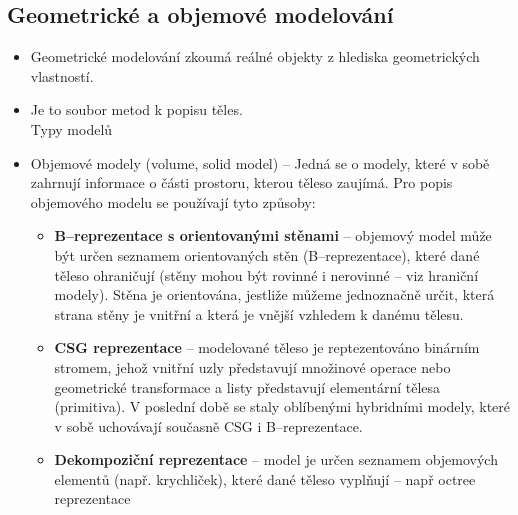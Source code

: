 
\subsection{Geometrické a objemové modelování}
\begin{itemize}
	\item Geometrické modelování zkoumá reálné objekty z hlediska geometrických vlastností.
	\item Je to soubor metod k popisu těles. \\ Typy modelů
	\item Objemové modely (volume, solid model) -- Jedná se o modely, které v sobě zahrnují informace o části prostoru, kterou těleso zaujímá. Pro popis objemového modelu se používají tyto způsoby:
	\begin{itemize}
		\item \textbf{B--reprezentace s orientovanými stěnami} -- objemový model může být určen seznamem orientovaných stěn (B--reprezentace), které dané těleso ohraničují (stěny mohou být rovinné i nerovinné -- viz hraniční modely). Stěna je orientována, jestliže můžeme jednoznačně určit, která strana stěny je vnitřní a která je vnější vzhledem k danému tělesu.
		\item \textbf{CSG reprezentace} -- modelované těleso je reptezentováno binárním stromem, jehož vnitřní uzly představují množinové operace nebo geometrické transformace a listy představují elementární tělesa (primitiva). V poslední době se staly oblíbenými hybridními modely, které v sobě uchovávají současně CSG i B--reprezentace.
		\item \textbf{Dekompoziční reprezentace} -- model je určen seznamem objemových elementů (např. krychliček), které dané těleso vyplňují -- např octree reprezentace
\end{itemize}


\end{itemize}
